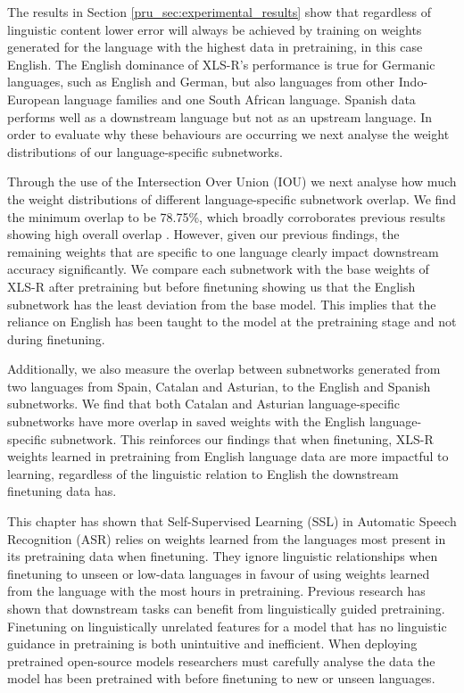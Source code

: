 The results in Section \ref{pru_sec:experimental_results} show that regardless of linguistic content lower error will always be achieved by training on weights generated for the language with the highest data in pretraining, in this case English. The English dominance of XLS-R's performance is true for Germanic languages, such as English and German, but also languages from other Indo-European language families and one South African language. Spanish data performs well as a downstream language but not as an upstream language. In order to evaluate why these behaviours are occurring we next analyse the weight distributions of our language-specific subnetworks.%

\newpage
Through the use of the Intersection Over Union (IOU) we next analyse how much the weight distributions of different language-specific subnetwork overlap. We find the minimum overlap to be 78.75\%, which broadly corroborates previous results showing high overall overlap \cite{PARP}. However, given our previous findings, the remaining weights that are specific to one language clearly impact downstream accuracy significantly. We compare each subnetwork with the base weights of XLS-R after pretraining but before finetuning showing us that the English subnetwork has the least deviation from the base model. This implies that the reliance on English has been taught to the model at the pretraining stage and not during finetuning. 

Additionally, we also measure the overlap between subnetworks generated from two languages from Spain, Catalan and Asturian, to the English and Spanish subnetworks. We find that both Catalan and Asturian language-specific subnetworks have more overlap in saved weights with the English language-specific subnetwork. This reinforces our findings that when finetuning, XLS-R weights learned in pretraining from English language data are more impactful to learning, regardless of the linguistic relation to English the downstream finetuning data has.

This chapter has shown that Self-Supervised Learning (SSL) in Automatic Speech Recognition (ASR) relies on weights learned from the languages most present in its pretraining data when finetuning. They ignore linguistic relationships when finetuning to unseen or low-data languages in favour of using weights learned from the language with the most hours in pretraining. Previous research \cite{zhang2023fast} has shown that downstream tasks can benefit from linguistically guided pretraining. Finetuning on linguistically unrelated features for a model that has no linguistic guidance in pretraining is both unintuitive and inefficient. When deploying pretrained open-source models researchers must carefully analyse the data the model has been pretrained with before finetuning to new or unseen languages. %

